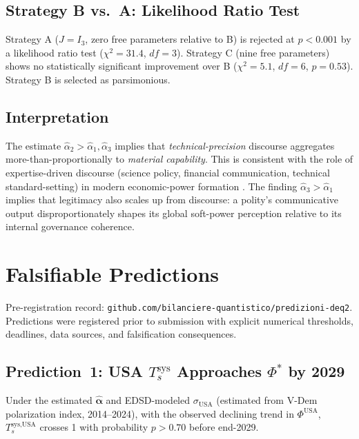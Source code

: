 \documentclass[12pt]{article}
\theoremstyle{plain}
\theoremstyle{definition}
\theoremstyle{remark}
\begin{document}
\subsection{Strategy B vs.\ A: Likelihood Ratio Test}

Strategy A ($J = I_3$, zero free parameters relative to B) is rejected at $p < 0.001$ by a likelihood ratio test ($\chi^2 = 31.4$, $df = 3$). Strategy C (nine free parameters) shows no statistically significant improvement over B ($\chi^2 = 5.1$, $df = 6$, $p = 0.53$). Strategy B is selected as parsimonious.

\subsection{Interpretation}

The estimate $\hat\alpha_2 > \hat\alpha_1, \hat\alpha_3$ implies that \emph{technical-precision} discourse aggregates more-than-proportionally to \emph{material capability}. This is consistent with the role of expertise-driven discourse (science policy, financial communication, technical standard-setting) in modern economic-power formation \citep{cox1987}. The finding $\hat\alpha_3 > \hat\alpha_1$ implies that legitimacy also scales up from discourse: a polity's communicative output disproportionately shapes its global soft-power perception relative to its internal governance coherence.

\section{Falsifiable Predictions}
\label{sec:predictions}

Pre-registration record: \texttt{github.com/bilanciere-quantistico/predizioni-deq2}. Predictions were registered prior to submission with explicit numerical thresholds, deadlines, data sources, and falsification consequences.

\subsection{Prediction~1: USA $T_s^{\text{sys}}$ Approaches $\Phi^*$ by 2029}

Under the estimated $\hat{\boldsymbol\alpha}$ and EDSD-modeled $\sigma_{\text{USA}}$ (estimated from V-Dem polarization index, 2014--2024), with the observed declining trend in $\Phi^{\text{USA}}$, $T_s^{\text{sys},\text{USA}}$ crosses 1 with probability $p > 0.70$ before end-2029.
\end{document}
